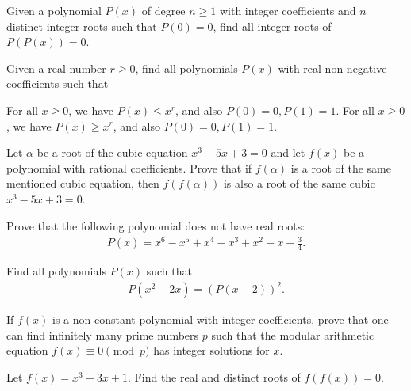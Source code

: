 \begin{question}[name={1999 Iran TST}]
    Given a polynomial $P(x)$ of degree $n\geq 1$ with integer coefficients and $n$ distinct integer roots such that $P(0)=0$, find all integer roots of $P(P(x))=0$.
\end{question}


\begin{question}[name={1999 Iran TST}]
    Given a real number $r\geq 0$, find all polynomials $P(x)$ with real non-negative coefficients such that
    \begin{tasks}
        \task For all $x\geq 0$, we have $P(x) \leq x^r$, and also $P(0)=0, P(1)=1$.
        \task For all $x\geq 0$, we have $P(x) \geq x^r$, and also $P(0)=0, P(1)=1$.
    \end{tasks}
\end{question}


\begin{question}[name={1990 Iran}]
    Let $\alpha$ be a root of the cubic equation $x^3-5x+3=0$ and let $f(x)$ be a polynomial with rational coefficients. Prove that if $f(\alpha)$ is a root of the same mentioned cubic equation, then $f(f(\alpha))$ is also a root of the same cubic $x^3-5x+3=0$.
\end{question}

\begin{question}
    Prove that the following polynomial does not have real roots:
    \begin{align*}
        P(x) = x^6 - x^5 + x^4 - x^3 + x^2 - x + \frac{3}{4}.
    \end{align*}
\end{question}



\begin{question}[name={1976 Bulgaria}]
    Find all polynomials $P(x)$ such that
    \begin{align*}
        P(x^2-2x)=(P(x-2))^2.
    \end{align*}
\end{question}

\begin{question}
    If $f(x)$ is a non-constant polynomial with integer coefficients, prove that one can find infinitely many prime numbers $p$ such that the modular arithmetic equation $f(x) \equiv 0 \pmod p$ has integer solutions for $x$.
\end{question}

\begin{question}[name={1998 Bulgaria}]
    Let $f(x)=x^3-3x+1$. Find the real and distinct roots of $f(f(x))=0$.
\end{question}


